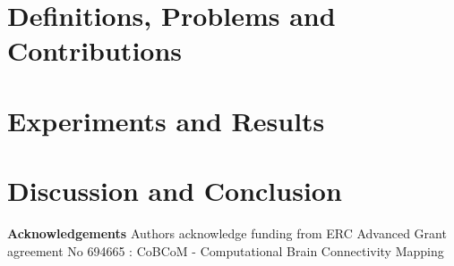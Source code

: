 \documentclass[runningheads,a4paper]{llncs}
\begin{document}
\section{Definitions, Problems and Contributions}\label{problem_section}


\section{Experiments and Results}


\section{Discussion and Conclusion}



{\small \textbf{Acknowledgements} Authors acknowledge funding from ERC Advanced Grant agreement No 694665 : CoBCoM - Computational Brain 
Connectivity Mapping}

\vspace{-.5cm}


%
\end{document}
